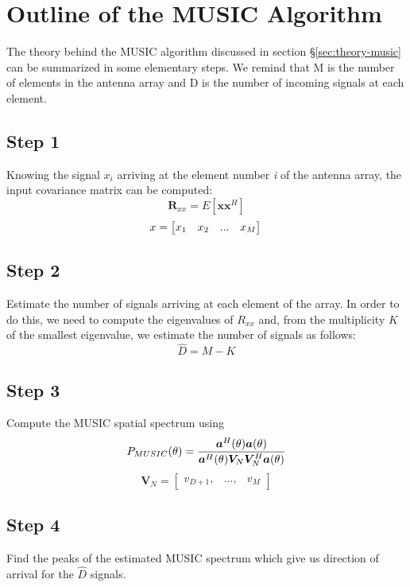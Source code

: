 
\section{Outline of the MUSIC Algorithm}
\label{sec:steps-music-algo}
The theory behind the MUSIC algorithm discussed in section
\S\ref{sec:theory-music} can be summarized in some elementary steps. We remind
that M is the number of elements in the antenna array and D is the number of
incoming signals at each element.

\subsection*{Step 1}
\label{ssec:step1}
Knowing the signal $x_i$ arriving at the element number \textit{i} of the
antenna array, the input covariance matrix can be computed:
\begin{equation}
    \bm{R}_{xx} = E[\bm{xx}^H]
\end{equation}
\begin{equation}
    x = \begin{bmatrix}x_1 & x_2 & ... & x_M \end{bmatrix} \\
\end{equation}

\subsection*{Step 2}
\label{ssec:step2}
Estimate the number of signals arriving at each element of the array. In order
to do this, we need to compute the eigenvalues of $R_{xx}$ and, from the
multiplicity $K$ of the smallest eigenvalue, we estimate the number of signals
as follows:
\begin{equation}
    \hat{D} = M - K
\end{equation}

\subsection*{Step 3}
\label{ssec:step3}
Compute the MUSIC spatial spectrum using
\begin{equation}
    P_{MUSIC}(\theta) =
        \frac{\bm{a}^H(\theta)\bm{a}(\theta)}
             {\bm{a}^H(\theta)\bm{V}_N\bm{V}_N^H\bm{a}(\theta)} \\
\end{equation}
\begin{equation}
    \bm{V}_N = \begin{bmatrix}v_{D+1}, & ..., & v_M \end{bmatrix}
\end{equation}

\subsection*{Step 4}
\label{ssec:step4}
Find the peaks of the estimated MUSIC spectrum which give us direction of
arrival for the $\hat{D}$ signals.
